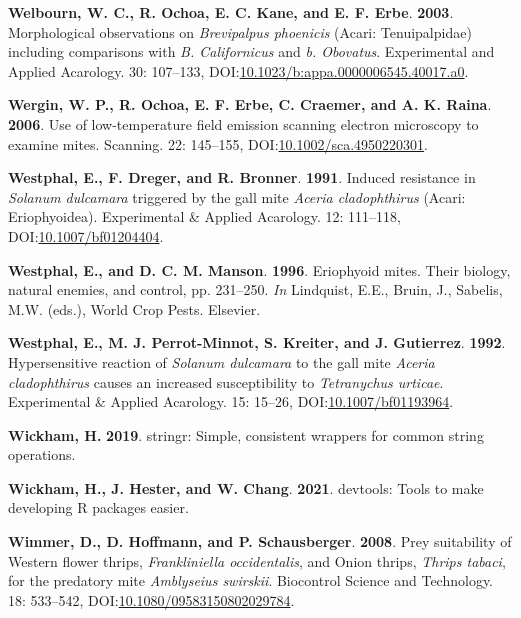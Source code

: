 \documentclass[12pt,final,CPage]{ufthesis}
\newlength{\cslhangindent}
\newenvironment{CSLReferences}[2] %
{%
	\setlength{\parindent}{0pt}
	\ifodd #1 \everypar{\setlength{\hangindent}{\cslhangindent}}\ignorespaces\fi
	\ifnum #2 > 0
	\setlength{\parskip}{#2\baselineskip}
	\fi
}%
{}
\begin{document}
{\begin{CSLReferences}{1}{0}
  \leavevmode{}%
  \textbf{Welbourn, W. C., R. Ochoa, E. C. Kane, and E. F. Erbe}. \textbf{2003}. Morphological observations on {\emph{Brevipalpus phoenicis}} ({Acari}: {Tenuipalpidae}) including comparisons with {\emph{B. Californicus}} and {\emph{b. Obovatus}}. Experimental and Applied Acarology. 30: 107--133, DOI:\href{https://doi.org/10.1023/b:appa.0000006545.40017.a0}{10.1023/b:appa.0000006545.40017.a0}.

  \leavevmode{}%
  \textbf{Wergin, W. P., R. Ochoa, E. F. Erbe, C. Craemer, and A. K. Raina}. \textbf{2006}. Use of low-temperature field emission scanning electron microscopy to examine mites. Scanning. 22: 145--155, DOI:\href{https://doi.org/10.1002/sca.4950220301}{10.1002/sca.4950220301}.

  \leavevmode{}%
  \textbf{Westphal, E., F. Dreger, and R. Bronner}. \textbf{1991}. Induced resistance in {\emph{Solanum dulcamara}} triggered by the gall mite {\emph{Aceria cladophthirus}} ({Acari}: {Eriophyoidea}). Experimental {\&} Applied Acarology. 12: 111--118, DOI:\href{https://doi.org/10.1007/bf01204404}{10.1007/bf01204404}.

  \leavevmode{}%
  \textbf{Westphal, E., and D. C. M. Manson}. \textbf{1996}. Eriophyoid mites. Their biology, natural enemies, and control, pp. 231--250. \emph{In} Lindquist, E.E., Bruin, J., Sabelis, M.W. (eds.), World Crop Pests. Elsevier.

  \leavevmode{}%
  \textbf{Westphal, E., M. J. Perrot-Minnot, S. Kreiter, and J. Gutierrez}. \textbf{1992}. Hypersensitive reaction of {\emph{Solanum dulcamara}} to the gall mite {\emph{Aceria cladophthirus}} causes an increased susceptibility to {\emph{Tetranychus urticae}}. Experimental {\&} Applied Acarology. 15: 15--26, DOI:\href{https://doi.org/10.1007/bf01193964}{10.1007/bf01193964}.

  \leavevmode{}%
  \textbf{Wickham, H.} \textbf{2019}. {stringr}: Simple, consistent wrappers for common string operations.

  \leavevmode{}%
  \textbf{Wickham, H., J. Hester, and W. Chang}. \textbf{2021}. {devtools}: Tools to make developing {R} packages easier.

  \leavevmode{}%
  \textbf{Wimmer, D., D. Hoffmann, and P. Schausberger}. \textbf{2008}. Prey suitability of {Western flower thrips}, {\emph{Frankliniella occidentalis}}, and {Onion thrips}, {\emph{Thrips tabaci}}, for the predatory mite {\emph{Amblyseius swirskii}}. Biocontrol Science and Technology. 18: 533--542, DOI:\href{https://doi.org/10.1080/09583150802029784}{10.1080/09583150802029784}.


\end{CSLReferences}}
\end{document}
